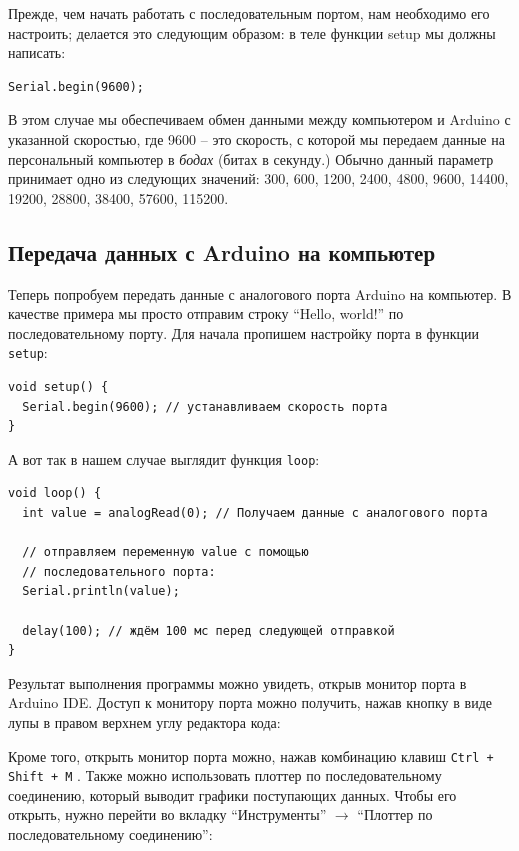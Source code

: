 \documentclass[a4paper,twoside]{book}
\newcommand{\hotkey}[1]{
  \texttt{#1}
}
\begin{document}
Прежде, чем начать работать с последовательным портом, нам необходимо его
настроить; делается это следующим образом: в теле функции setup мы должны
написать:

\begin{verbatim}
Serial.begin(9600);
\end{verbatim}

В этом случае мы обеспечиваем обмен данными между компьютером и Arduino с
указанной скоростью, где 9600 -- это скорость, с которой мы передаем данные на
персональный компьютер в \emph{бодах} (битах в секунду.) Обычно данный параметр
принимает одно из следующих значений: 300, 600, 1200, 2400, 4800, 9600, 14400,
19200, 28800, 38400, 57600, 115200.

\subsection{Передача данных с Arduino на компьютер}

Теперь попробуем передать данные с аналогового порта Arduino на компьютер. В
качестве примера мы просто отправим строку ``Hello, world!'' по
последовательному порту. Для начала пропишем настройку порта в функции
\texttt{setup}:

\begin{verbatim}
void setup() {
  Serial.begin(9600); // устанавливаем скорость порта
}
\end{verbatim}

А вот так в нашем случае выглядит функция \texttt{loop}:

\begin{verbatim}
void loop() {
  int value = analogRead(0); // Получаем данные с аналогового порта

  // отправляем переменную value с помощью
  // последовательного порта:
  Serial.println(value);

  delay(100); // ждём 100 мс перед следующей отправкой
}
\end{verbatim}

Результат выполнения программы можно увидеть, открыв монитор порта в Arduino
IDE. Доступ к монитору порта можно получить, нажав кнопку в виде лупы в правом
верхнем углу редактора кода:

Кроме того, открыть монитор порта можно, нажав комбинацию клавиш \hotkey{Ctrl +
  Shift + M}. Также можно использовать плоттер по последовательному соединению,
который выводит графики поступающих данных. Чтобы его открыть, нужно перейти во
вкладку ``Инструменты'' $\rightarrow$ ``Плоттер по последовательному
соединению'':
\end{document}

